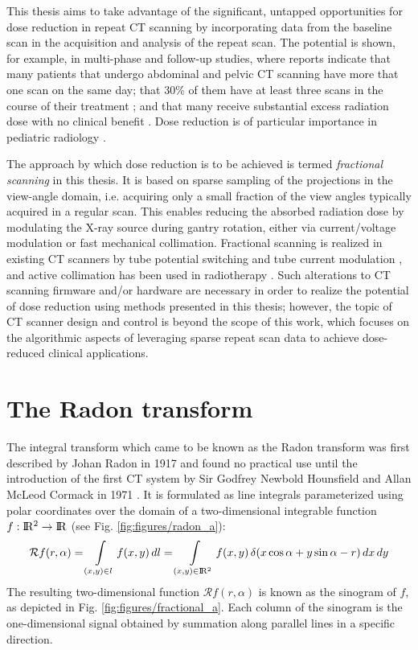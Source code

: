 This thesis aims to take advantage of the significant, untapped opportunities for dose reduction in repeat CT scanning by incorporating data from the baseline scan in the acquisition and analysis of the repeat scan. The potential is shown, for example, in multi-phase and follow-up studies, where reports indicate that many patients that undergo abdominal and pelvic CT scanning have more that one scan on the same day; that 30\% of them have at least three scans in the course of their treatment \cite{davies2011risks}; and that many receive substantial excess radiation dose with no clinical benefit \cite{mettler2000ct}. Dose reduction is of particular importance in pediatric radiology \cite{donnelly2005reducing, chodick2007excess}.

The approach by which dose reduction is to be achieved is termed \textit{fractional scanning} in this thesis. 
It is based on sparse sampling of the projections in the view-angle domain, i.e. acquiring only a small fraction of the view angles typically acquired in a regular scan.
This enables reducing the absorbed radiation dose by modulating the X-ray source during gantry rotation, either via current/voltage modulation or fast mechanical collimation.
Fractional scanning is realized in existing CT scanners by tube potential switching and tube current modulation \cite{kalra2004techniques}, and active collimation has been used in radiotherapy \cite{mackie2006history}.
Such alterations to CT scanning firmware and/or hardware are necessary in order to realize the potential of dose reduction using methods presented in this thesis; however, the topic of CT scanner design and control is beyond the scope of this work, which focuses on the algorithmic aspects of leveraging sparse repeat scan data to achieve dose-reduced clinical applications.

\section{The Radon transform}

The integral transform which came to be known as the Radon transform was first described by Johan Radon in 1917 \cite{radon1917determination} and found no practical use until the introduction of the first CT system by Sir Godfrey Newbold Hounsfield and Allan McLeod Cormack in 1971 \cite{maier2018medical}. It is formulated as line integrals parameterized using polar coordinates over the domain of a two-dimensional integrable function $f: \rm I\!R ^2 \rightarrow \rm I\!R $ (see Fig. \ref{fig:figures/radon_a}):
\begin{equation}
\mathcal{R} f(r, \alpha) 
= \int \displaylimits_{(x,y) \in l} f(x,y)\, dl \\
= \int \displaylimits_{(x,y) \in \rm I\!R ^2} { f(x,y)\, \delta(x \cos \alpha + y \sin \alpha - r)}\, dx\, dy
\end{equation}
The resulting two-dimensional function $\mathcal{R} f(r, \alpha)$ is known as the sinogram of $f$, as depicted in Fig. \ref{fig:figures/fractional_a}. Each column of the sinogram is the one-dimensional signal obtained by summation along parallel lines in a specific direction.

